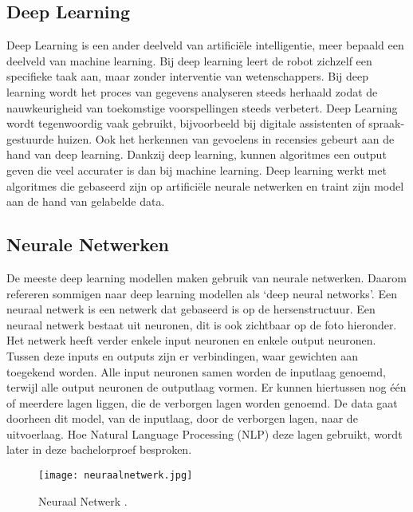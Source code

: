 \subsection{Deep Learning}
\label{sec:deeplearning}
Deep Learning is een ander deelveld van artificiële intelligentie, meer bepaald een deelveld van machine learning. Bij deep learning leert de robot zichzelf een specifieke taak aan, maar zonder interventie van wetenschappers. \autocite{IBM2020} Bij deep learning wordt het proces van gegevens analyseren steeds herhaald zodat de nauwkeurigheid van toekomstige voorspellingen steeds verbetert. Deep Learning wordt tegenwoordig vaak gebruikt, bijvoorbeeld bij digitale assistenten of spraak-gestuurde huizen. \autocite{IBM2020}
Ook het herkennen van gevoelens in recensies gebeurt aan de hand van deep learning. 
Dankzij deep learning, kunnen algoritmes een output geven die veel accurater is dan bij machine learning. Deep learning werkt met algoritmes die gebaseerd zijn op artificiële neurale netwerken en traint zijn model aan de hand van gelabelde data.


\subsection{Neurale Netwerken}
\label{sec:neuralnetworks}

De meeste deep learning modellen maken gebruik van neurale netwerken. Daarom refereren sommigen naar deep learning modellen als ‘deep neural networks’. 
Een neuraal netwerk is een netwerk dat gebaseerd is op de hersenstructuur. Een neuraal netwerk bestaat uit neuronen, dit is ook zichtbaar op de foto hieronder. Het netwerk heeft verder enkele input neuronen en enkele output neuronen. Tussen deze inputs en outputs zijn er verbindingen, waar gewichten aan toegekend worden. Alle input neuronen samen worden de inputlaag genoemd, terwijl alle output neuronen de outputlaag vormen. Er kunnen hiertussen nog één of meerdere lagen liggen, die de verborgen lagen worden genoemd. De data gaat doorheen dit model, van de inputlaag, door de verborgen lagen, naar de uitvoerlaag. Hoe Natural Language Processing (NLP) deze lagen gebruikt, wordt later in deze bachelorproef besproken. \autocite{Vervoort2017}

\begin{figure}[!ht]
    \texttt{[image: neuraalnetwerk.jpg]}
    \caption{\label{neuraalnetwerk}Neuraal Netwerk \autocite{KULeuven2019}.}
\end{figure}

